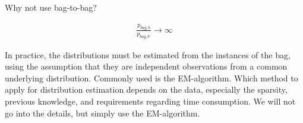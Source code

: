 Why not use bag-to-bag?

\begin{align}
  \frac{p_{bag,b}}{p_{bag,b'}} \rightarrow \infty
\end{align}


In practice, the distributions must be estimated from the instances of the bag, using the assumption that they are independent observations from a common underlying distribution. 
Commonly used is the EM-algorithm.
Which method to apply for distribution estimation depends on the data, especially the sparsity, previous knowledge, and requirements regarding time consumption. 
We will not go into the details, but simply use the EM-algorithm.


